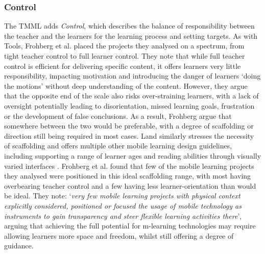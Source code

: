 \subsubsection{Control}
The TMML adds \textit{Control}, which describes the balance of responsibility between the teacher and the learners for the learning process and setting targets. As with Tools, Frohberg et al. placed the projects they analysed on a spectrum, from tight teacher control to full learner control. They note that while full teacher control is efficient for delivering specific content, it offers learners very little responsibility, impacting motivation and introducing the danger of learners `doing the motions' without deep understanding of the content. However, they argue that the opposite end of the scale also risks over-straining learners, with a lack of oversight potentially leading to disorientation, missed learning goals, frustration or the development of false conclusions. As a result, Frohberg argue that somewhere between the two would be preferable, with a degree of scaffolding or direction still being required in most cases. Land similarly stresses the necessity of scaffolding and offers multiple other mobile learning design guidelines, including supporting a range of learner ages and reading abilities through visually varied interfaces \citep{Land2015}. Frohberg et al. found that few of the mobile learning projects they analysed were positioned in this ideal scaffolding range, with most having overbearing teacher control and a few having less learner-orientation than would be ideal. They note: `\textit{very few mobile learning projects with physical context explicitly considered, positioned or focused the usage of mobile technology as instruments to gain transparency and steer flexible learning activities there}', arguing that achieving the full potential for m-learning technologies may require allowing learners more space and freedom, whilst still offering a degree of guidance.

